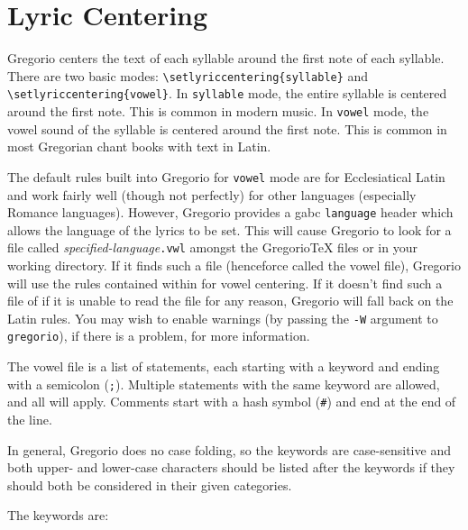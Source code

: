 \section{Lyric Centering}

Gregorio centers the text of each syllable around the first note of each
syllable.  There are two basic modes: \verb:\setlyriccentering{syllable}:
and \verb:\setlyriccentering{vowel}:.  In \texttt{syllable} mode, the
entire syllable is centered around the first note.  This is common in
modern music.  In \texttt{vowel} mode, the vowel sound of the syllable is
centered around the first note.  This is common in most Gregorian chant
books with text in Latin.

The default rules built into Gregorio for \texttt{vowel} mode are for
Ecclesiatical Latin and work fairly well (though not perfectly) for
other languages (especially Romance languages).  However, Gregorio
provides a gabc \texttt{language} header which allows the language of
the lyrics to be set.  This will cause Gregorio to look for a file
called \textit{specified-language}\texttt{.vwl} amongst the GregorioTeX
files or in your working directory.  If it finds such a file (henceforce
called the vowel file), Gregorio will use the rules contained within for
vowel centering.  If it doesn't find such a file of if it is unable to
read the file for any reason, Gregorio will fall back on the Latin
rules.  You may wish to enable warnings (by passing the \texttt{-W}
argument to \texttt{gregorio}), if there is a problem, for more
information.

The vowel file is a list of statements, each starting with a keyword and
ending with a semicolon (\texttt{;}).  Multiple statements with the same
keyword are allowed, and all will apply.  Comments start with a hash
symbol (\texttt{\#}) and end at the end of the line.

In general, Gregorio does no case folding, so the keywords are
case-sensitive and both upper- and lower-case characters should be
listed after the keywords if they should both be considered in their
given categories.


The keywords are:


